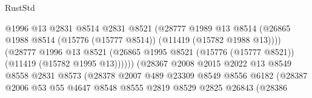 \begin{lexlean}{RustStd}
\begin{coremodule}
                                          @1996
                                          @13
                                          @2831
                                          @8514
                                          @2831
                                          @8521
                                          (@28777
                                            @1989
                                            @13
                                            @8514
                                            (@26865
                                              @1988
                                              @8514
                                              (@15776 (@15777 @8514))
                                              (@11419 (@15782 @1988 @13))))
                                          (@28777
                                            @1996
                                            @13
                                            @8521
                                            (@26865
                                              @1995
                                              @8521
                                              (@15776 (@15777 @8521))
                                              (@11419 (@15782 @1995 @13))))))
                                      (@28367
                                        @2008
                                        @2015
                                        @2022
                                        @13
                                        @8549
                                        @8558
                                        @2831
                                        @8573
                                        (@28378
                                          @2007
                                          @489
                                          @23309
                                          @8549
                                          @8556
                                          @6182
                                          (@28387
                                            @2006
                                            @53
                                            @55
                                            @4647
                                            @8548
                                            @8555
                                            @2819
                                            @8529
                                            @2825
                                            @26843
                                            (@28386

\end{coremodule}
\end{lexlean}
